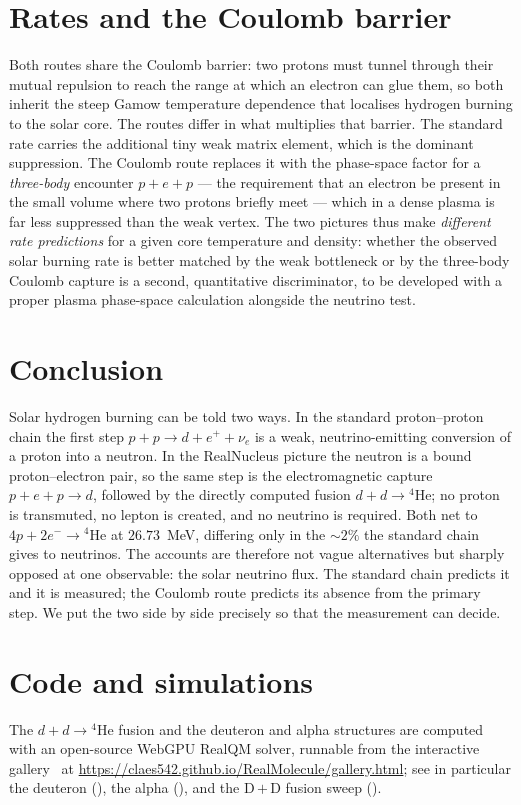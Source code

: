 \documentclass[11pt]{article}
\begin{document}
\section{Rates and the Coulomb barrier}

Both routes share the Coulomb barrier: two protons must tunnel through their mutual repulsion to reach
the range at which an electron can glue them, so both inherit the steep Gamow temperature dependence
that localises hydrogen burning to the solar core. The routes differ in what multiplies that barrier.
The standard rate carries the additional tiny weak matrix element, which is the dominant suppression.
The Coulomb route replaces it with the phase-space factor for a \emph{three-body} encounter
$p+e+p$ --- the requirement that an electron be present in the small volume where two protons briefly
meet --- which in a dense plasma is far less suppressed than the weak vertex. The two pictures thus
make \emph{different rate predictions} for a given core temperature and density: whether the observed
solar burning rate is better matched by the weak bottleneck or by the three-body Coulomb capture is a
second, quantitative discriminator, to be developed with a proper plasma phase-space calculation
alongside the neutrino test.

\section{Conclusion}

Solar hydrogen burning can be told two ways. In the standard proton--proton chain the first step
$p+p\to d+e^{+}+\nu_e$ is a weak, neutrino-emitting conversion of a proton into a neutron. In the
RealNucleus picture the neutron is a bound proton--electron pair, so the same step is the
electromagnetic capture $p+e+p\to d$, followed by the directly computed fusion $d+d\to{}^4\mathrm{He}$;
no proton is transmuted, no lepton is created, and no neutrino is required. Both net to
$4p+2e^-\to{}^4\mathrm{He}$ at $26.73$~MeV, differing only in the ${\sim}2\%$ the standard chain gives
to neutrinos. The accounts are therefore not vague alternatives but sharply opposed at one observable:
the solar neutrino flux. The standard chain predicts it and it is measured; the Coulomb route predicts
its absence from the primary step. We put the two side by side precisely so that the measurement can
decide.

\section*{Code and simulations}
\sloppy
The $d+d\to{}^4\mathrm{He}$ fusion and the deuteron and alpha structures are computed with an
open-source WebGPU RealQM solver, runnable from the interactive gallery~\cite{Gallery} at
\url{https://claes542.github.io/RealMolecule/gallery.html}; see in particular the deuteron
(), the alpha (), and the D\,$+$\,D fusion sweep
().
\fussy
\end{document}
